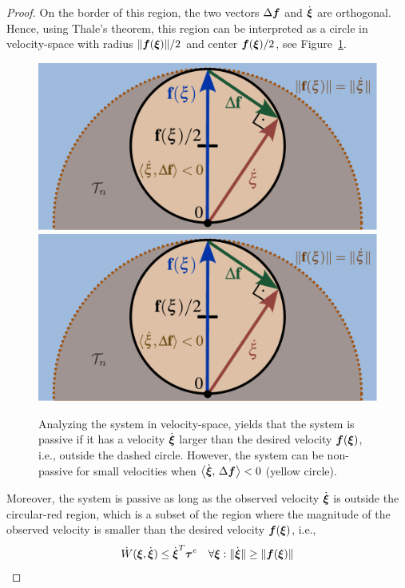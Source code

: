 \begin{proof}
On the border of this region, the two vectors $\Delta \boldsymbol{f}$ and $\dot{{\boldsymbol{\xi}}}$ are orthogonal.
Hence, using Thale's theorem, this region can be interpreted as a circle in velocity-space with radius $\| \boldsymbol{f} ({\boldsymbol{\xi}}) \| / 2$ and center $\boldsymbol{f}({\boldsymbol{\xi}}) / 2$, see Figure~\ref{fig:passivity_analysis}.

\begin{figure}[thb]
	\centering
	\ifthesis
    \includegraphics[width=0.7\columnwidth]{figures/passivity_analysis}
	\else
    \includegraphics[width=.7\columnwidth]{figures/passivity_analysis}
	\fi
	\caption{Analyzing the system in velocity-space, yields that the system is passive if it has a velocity $\dot{\boldsymbol{\xi}}$ larger than the desired velocity $\boldsymbol{f}(\boldsymbol{\xi})$, i.e., outside the dashed circle.
    However, the system can be non-passive for small velocities when  $\left\langle {\dot{\boldsymbol{\xi}}}, \, {\Delta \boldsymbol{f}} \right\rangle < 0$ (yellow circle).}
	\label{fig:passivity_analysis}
\end{figure}

Moreover, the system is passive as long as the observed velocity $\dot{{\boldsymbol{\xi}}}$ is outside the circular-red region, which is a subset of the region where the magnitude of the observed velocity is smaller than the desired velocity $\boldsymbol{f}({\boldsymbol{\xi}})$, i.e.,
\begin{equation}
	\dot W({\boldsymbol{\xi}}, \dot{{\boldsymbol{\xi}}}) \leq \dot{{\boldsymbol{\xi}}}^T \boldsymbol{\tau}^e
 \quad \forall {\boldsymbol{\xi}} : \| \dot{{\boldsymbol{\xi}}} \| \geq\| \boldsymbol{f}({\boldsymbol{\xi}}) \| 
\end{equation}

\end{proof}

